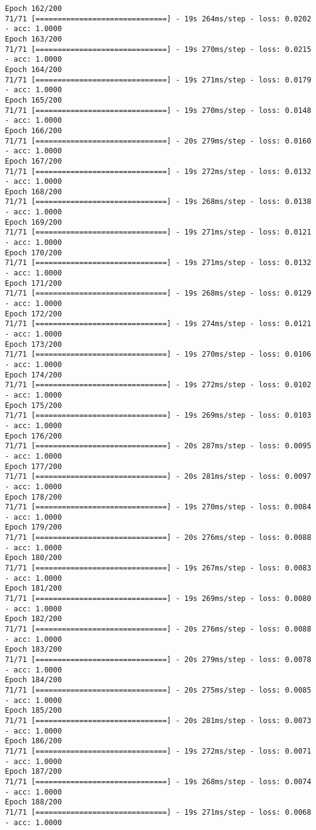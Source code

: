 \documentclass[11pt]{article}
\begin{document}
\begin{Verbatim}[commandchars=\\\{\}]
Epoch 162/200
71/71 [==============================] - 19s 264ms/step - loss: 0.0202 - acc: 1.0000
Epoch 163/200
71/71 [==============================] - 19s 270ms/step - loss: 0.0215 - acc: 1.0000
Epoch 164/200
71/71 [==============================] - 19s 271ms/step - loss: 0.0179 - acc: 1.0000
Epoch 165/200
71/71 [==============================] - 19s 270ms/step - loss: 0.0148 - acc: 1.0000
Epoch 166/200
71/71 [==============================] - 20s 279ms/step - loss: 0.0160 - acc: 1.0000
Epoch 167/200
71/71 [==============================] - 19s 272ms/step - loss: 0.0132 - acc: 1.0000
Epoch 168/200
71/71 [==============================] - 19s 268ms/step - loss: 0.0138 - acc: 1.0000
Epoch 169/200
71/71 [==============================] - 19s 271ms/step - loss: 0.0121 - acc: 1.0000
Epoch 170/200
71/71 [==============================] - 19s 271ms/step - loss: 0.0132 - acc: 1.0000
Epoch 171/200
71/71 [==============================] - 19s 268ms/step - loss: 0.0129 - acc: 1.0000
Epoch 172/200
71/71 [==============================] - 19s 274ms/step - loss: 0.0121 - acc: 1.0000
Epoch 173/200
71/71 [==============================] - 19s 270ms/step - loss: 0.0106 - acc: 1.0000
Epoch 174/200
71/71 [==============================] - 19s 272ms/step - loss: 0.0102 - acc: 1.0000
Epoch 175/200
71/71 [==============================] - 19s 269ms/step - loss: 0.0103 - acc: 1.0000
Epoch 176/200
71/71 [==============================] - 20s 287ms/step - loss: 0.0095 - acc: 1.0000
Epoch 177/200
71/71 [==============================] - 20s 281ms/step - loss: 0.0097 - acc: 1.0000
Epoch 178/200
71/71 [==============================] - 19s 270ms/step - loss: 0.0084 - acc: 1.0000
Epoch 179/200
71/71 [==============================] - 20s 276ms/step - loss: 0.0088 - acc: 1.0000
Epoch 180/200
71/71 [==============================] - 19s 267ms/step - loss: 0.0083 - acc: 1.0000
Epoch 181/200
71/71 [==============================] - 19s 269ms/step - loss: 0.0080 - acc: 1.0000
Epoch 182/200
71/71 [==============================] - 20s 276ms/step - loss: 0.0088 - acc: 1.0000
Epoch 183/200
71/71 [==============================] - 20s 279ms/step - loss: 0.0078 - acc: 1.0000
Epoch 184/200
71/71 [==============================] - 20s 275ms/step - loss: 0.0085 - acc: 1.0000
Epoch 185/200
71/71 [==============================] - 20s 281ms/step - loss: 0.0073 - acc: 1.0000
Epoch 186/200
71/71 [==============================] - 19s 272ms/step - loss: 0.0071 - acc: 1.0000
Epoch 187/200
71/71 [==============================] - 19s 268ms/step - loss: 0.0074 - acc: 1.0000
Epoch 188/200
71/71 [==============================] - 19s 271ms/step - loss: 0.0068 - acc: 1.0000

\end{Verbatim}
\end{document}
